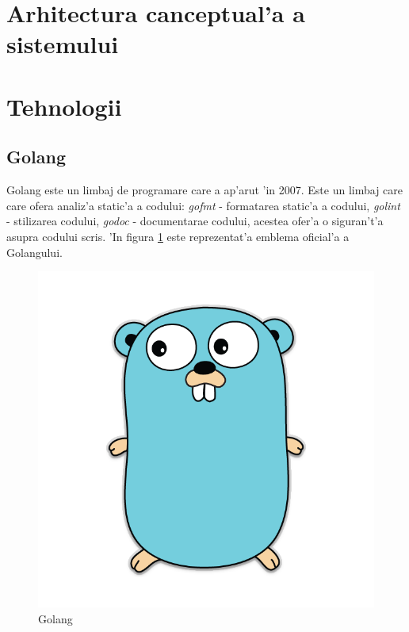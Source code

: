 \documentclass[12pt,a4paper,twoside]{report}
\begin{document}
\section{Arhitectura canceptual'a a sistemului}

\section{Tehnologii}
\subsection{Golang}
Golang  este un limbaj de programare care a ap'arut 'in 2007. Este un limbaj care care ofera analiz'a static'a a codului: \textit{gofmt} - formatarea static'a a codului, \textit{golint} - stilizarea codului, \textit{godoc} - documentarae codului, acestea ofer'a o siguran't'a asupra codului scris. 'In figura \ref{golang_pic} este reprezentat'a emblema oficial'a a Golangului.
\begin{figure}[H]
\begin{center}
\advance\leftskip-3cm
\advance\rightskip-3cm
\includegraphics[keepaspectratio=true,scale=0.15]{img/golang.png}
\caption{Golang}
\label{golang_pic}
\end{center}
\end{figure}
\end{document}
